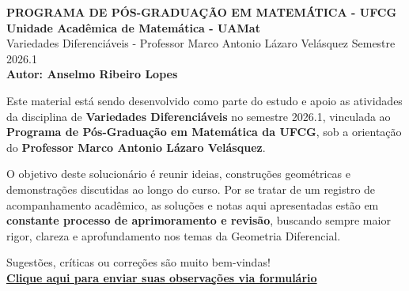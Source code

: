 \documentclass[10pt]{article}
\begin{document}
	
	\begin{flushleft}
		\textbf{PROGRAMA DE PÓS-GRADUAÇÃO EM MATEMÁTICA - UFCG\\
			Unidade Acadêmica de Matemática - UAMat}\\
		Variedades Diferenciáveis - Professor Marco Antonio Lázaro Velásquez \hfill Semestre 2026.1 \\
		\textbf{Autor: Anselmo Ribeiro Lopes}
	\end{flushleft}
	
	\vspace{0.5cm}

	\begin{tcolorbox}[
		enhanced, sharp corners, boxrule=0.5pt,
		colback=gray!6!white, colframe=black, width=\textwidth,
		fontupper=\normalfont %
		]
		Este material está sendo desenvolvido como parte do estudo e apoio as atividades da disciplina de \textbf{Variedades Diferenciáveis} no semestre 2026.1, vinculada ao \textbf{Programa de Pós-Graduação em Matemática da UFCG}, sob a orientação do \textbf{Professor Marco Antonio Lázaro Velásquez}. 
		
		O objetivo deste solucionário é reunir ideias, construções geométricas e demonstrações discutidas ao longo do curso. Por se tratar de um registro de acompanhamento acadêmico, as soluções e notas aqui apresentadas estão em \textbf{constante processo de aprimoramento e revisão}, buscando sempre maior rigor, clareza e aprofundamento nos temas da Geometria Diferencial.
		
		\vspace{0.3cm}
		\centering
		Sugestões, críticas ou correções são muito bem-vindas!\\
		\vspace{0.1cm}
		\href{https://forms.gle/UcBrKWL7YxdXCX7y9}{\textbf{\color{blue!70!black}Clique aqui para enviar suas observações via formulário}}
	\end{tcolorbox}
	
	\vspace{0.8cm}
	
	\begin{center}
	\end{center}
	
	\vspace{1cm}
	
	\renewcommand{\contentsname}{Sumário}
	\tableofcontents
	\vfill %
	
\end{document}
